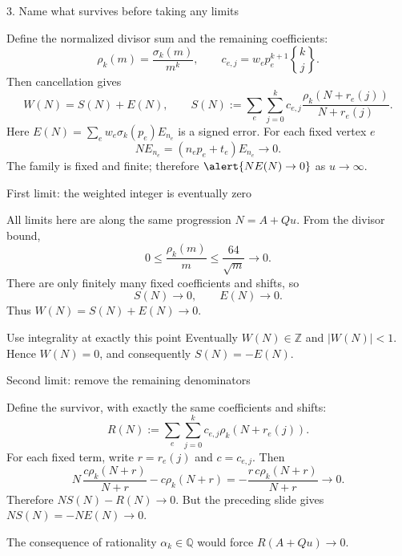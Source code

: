 \documentclass[11pt,aspectratio=169]{beamer}
\newcommand{\Z}{\mathbb{Z}}
\newcommand{\Q}{\mathbb{Q}}
\newcommand{\stir}[2]{\genfrac{\{}{\}}{0pt}{}{#1}{#2}}
\begin{document}

\begin{frame}{3. Name what survives before taking any limits}

Define the normalized divisor sum and the remaining coefficients:
\[
 \rho_k(m)=\frac{\sigma_k(m)}{m^k},\qquad
 c_{e,j}=w_e p_e^{k+1}\stir{k}{j}.
\]
Then cancellation gives
\[
 W(N)=S(N)+E(N),\qquad
 S(N):=\sum_e\sum_{j=0}^k
      c_{e,j}\frac{\rho_k(N+r_e(j))}{N+r_e(j)}.
\]
Here $E(N)=\sum_e w_e\sigma_k(p_e)E_{n_e}$ is a signed error.
For each fixed vertex $e$
\[
 NE_{n_e}=(n_e p_e+t_e)E_{n_e}\longrightarrow0.
\]
The family is fixed and finite; therefore $\alert{NE(N)\to0}$ as $u\to\infty$.

\end{frame}


\begin{frame}{First limit: the weighted integer is eventually zero}

All limits here are along the same progression $N=A+Qu$.
From the divisor bound,
\[
 0\le\frac{\rho_k(m)}m\le\frac{64}{\sqrt m}\longrightarrow0.
\]
There are only finitely many fixed coefficients and shifts, so
\[
 S(N)\longrightarrow0,\qquad E(N)\longrightarrow0.
\]
Thus $W(N)=S(N)+E(N)\to0$.
\begin{block}{Use integrality at exactly this point}
Eventually $W(N)\in\Z$ and $|W(N)|<1$.
Hence $W(N)=0$, and consequently $S(N)=-E(N)$.
\end{block}

\end{frame}


\begin{frame}{Second limit: remove the remaining denominators}

Define the \alert{survivor}, with exactly the same coefficients and shifts:
\[
 R(N):=\sum_e\sum_{j=0}^k c_{e,j}\rho_k(N+r_e(j)).
\]
For each fixed term, write $r=r_e(j)$ and $c=c_{e,j}$. Then
\[
 N\,\frac{c\rho_k(N+r)}{N+r}-c\rho_k(N+r)
   =-\frac{r\,c\rho_k(N+r)}{N+r}\longrightarrow0.
\]
Therefore $NS(N)-R(N)\to0$. But the preceding slide gives
$NS(N)=-NE(N)\to0$.
\begin{block}{The consequence of rationality}
$\alpha_k\in\Q$ would force $R(A+Qu)\longrightarrow0$.
\end{block}

\end{frame}
\end{document}
